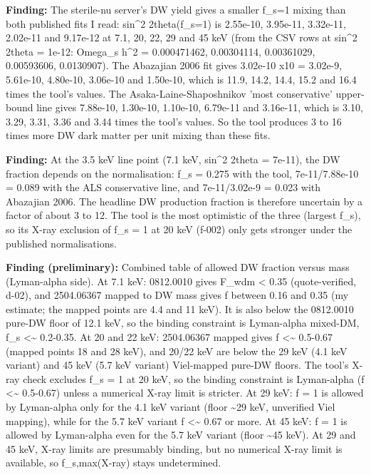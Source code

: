\documentclass[11pt,a4paper]{article}
\begin{document}
\textbf{Finding:} The sterile-nu server's DW yield gives a smaller f\_s=1 mixing than both published fits I read: sin\textasciicircum{}2 2theta(f\_s=1) is 2.55e-10, 3.95e-11, 3.32e-11, 2.02e-11 and 9.17e-12 at 7.1, 20, 22, 29 and 45 keV (from the CSV rows at sin\textasciicircum{}2 2theta = 1e-12: Omega\_s h\textasciicircum{}2 = 0.000471462, 0.00304114, 0.00361029, 0.00593606, 0.0130907). The Abazajian 2006 fit gives 3.02e-10 x10 = 3.02e-9, 5.61e-10, 4.80e-10, 3.06e-10 and 1.50e-10, which is 11.9, 14.2, 14.4, 15.2 and 16.4 times the tool's values. The Asaka-Laine-Shaposhnikov 'most conservative' upper-bound line gives 7.88e-10, 1.30e-10, 1.10e-10, 6.79e-11 and 3.16e-11, which is 3.10, 3.29, 3.31, 3.36 and 3.44 times the tool's values. So the tool produces 3 to 16 times more DW dark matter per unit mixing than these fits.

\textbf{Finding:} At the 3.5 keV line point (7.1 keV, sin\textasciicircum{}2 2theta = 7e-11), the DW fraction depends on the normalisation: f\_s = 0.275 with the tool, 7e-11/7.88e-10 = 0.089 with the ALS conservative line, and 7e-11/3.02e-9 = 0.023 with Abazajian 2006. The headline DW production fraction is therefore uncertain by a factor of about 3 to 12. The tool is the most optimistic of the three (largest f\_s), so its X-ray exclusion of f\_s = 1 at 20 keV (f-002) only gets stronger under the published normalisations.

\textbf{Finding (preliminary):} Combined table of allowed DW fraction versus mass (Lyman-alpha side). At 7.1 keV: 0812.0010 gives F\_wdm \textless{} 0.35 (quote-verified, d-02), and 2504.06367 mapped to DW mass gives f between 0.16 and 0.35 (my estimate; the mapped points are 4.4 and 11 keV). It is also below the 0812.0010 pure-DW floor of 12.1 keV, so the binding constraint is Lyman-alpha mixed-DM, f\_s \textless{}\textasciitilde{} 0.2-0.35. At 20 and 22 keV: 2504.06367 mapped gives f \textless{}\textasciitilde{} 0.5-0.67 (mapped points 18 and 28 keV), and 20/22 keV are below the 29 keV (4.1 keV variant) and 45 keV (5.7 keV variant) Viel-mapped pure-DW floors. The tool's X-ray check excludes f\_s = 1 at 20 keV, so the binding constraint is Lyman-alpha (f \textless{}\textasciitilde{} 0.5-0.67) unless a numerical X-ray limit is stricter. At 29 keV: f = 1 is allowed by Lyman-alpha only for the 4.1 keV variant (floor \textasciitilde{}29 keV, unverified Viel mapping), while for the 5.7 keV variant f \textless{}\textasciitilde{} 0.67 or more. At 45 keV: f = 1 is allowed by Lyman-alpha even for the 5.7 keV variant (floor \textasciitilde{}45 keV). At 29 and 45 keV, X-ray limits are presumably binding, but no numerical X-ray limit is available, so f\_s,max(X-ray) stays undetermined.
\end{document}

